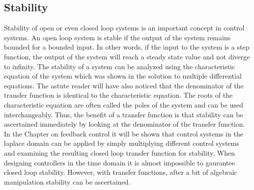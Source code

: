 \subsection{Stability}

Stability of open or even closed loop systems is an important concept in control systems. An open loop system is stable if the output of the system remains bounded for a bounded input. In other words, if the input to the system is a step function, the output of the system will reach a steady state value and not diverge to infinity. The stability of a system can be analyzed using the characteristic equation of the system which was shown in the solution to multiple differential equations. The astute reader will have also noticed that the denominator of the transfer function is identical to the characteristic equation. The roots of the characteristic equation are often called the poles of the system and can be used interchangeably. Thus, the benefit of a transfer function is that stability can be ascertained immediately by looking at the denominator of the transfer function. In the Chapter on feedback control it will be shown that control systems in the laplace domain can be applied by simply multiplying different control systems and examining the resulting closed loop transfer function for stability. When designing controllers in the time domain it is almost impossible to gaurantee closed loop stability. However, with transfer functions, after a bit of algebraic manipulation stability can be ascertained. 

